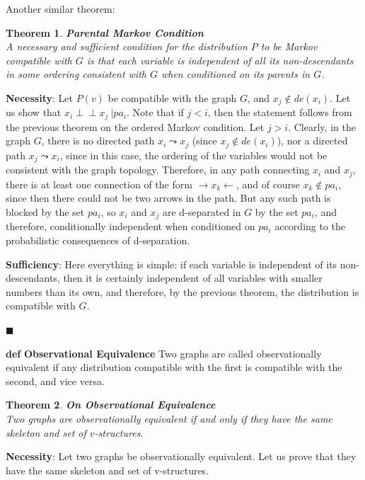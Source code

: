 \documentclass[fleqn]{article}
\newcommand{\independent}{\perp \!\!\! \perp}
\def\define#1{\textbf{def} \textbf{#1}}
\newtheorem{theorem}{Theorem}
\numberwithin{equation}{section}
\numberwithin{theorem}{section}
\numberwithin{figure}{section}
\numberwithin{lemma}{section}
\numberwithin{corollary}{section}
\begin{document}
Another similar theorem:

\begin{theorem} \textbf{Parental Markov Condition}\\
	A necessary and sufficient condition for the distribution \( P \) to be Markov compatible with \( G \) is that each variable is independent of all its \textit{non-descendants} in some ordering consistent with \( G \) when conditioned on its parents in \( G \).
\end{theorem}

\textbf{Necessity}: Let \( P(v) \) be compatible with the graph \( G \), and \( x_j \notin de(x_i) \). Let us show that \( x_i \independent x_j \ |pa_i \). Note that if \( j < i \), then the statement follows from the previous theorem on the ordered Markov condition. Let \( j > i \). Clearly, in the graph \( G \), there is no directed path \( x_i \leadsto x_j \) (since \( x_j \notin de(x_i) \)), nor a directed path \( x_j \leadsto x_i \), since in this case, the ordering of the variables would not be consistent with the graph topology. Therefore, in any path connecting \( x_i \) and \( x_j \), there is at least one connection of the form \( \rightarrow x_k \leftarrow \), and of course \( x_k \notin pa_i \), since then there could not be two arrows in the path. But any such path is blocked by the set \( pa_i \), so \( x_i \) and \( x_j \) are d-separated in \( G \) by the set \( pa_i \), and therefore, conditionally independent when conditioned on \( pa_i \) according to the probabilistic consequences of d-separation.

\textbf{Sufficiency}: Here everything is simple: if each variable is independent of its non-descendants, then it is certainly independent of all variables with smaller numbers than its own, and therefore, by the previous theorem, the distribution is compatible with \( G \).

\(\blacksquare\)

\define{Observational Equivalence} Two graphs are called observationally equivalent if any distribution compatible with the first is compatible with the second, and vice versa.

\begin{theorem} \textbf{On Observational Equivalence}\\
	Two graphs are observationally equivalent if and only if they have the same skeleton and set of \( v \)-structures.
\end{theorem}

\textbf{Necessity}: Let two graphs be observationally equivalent. Let us prove that they have the same skeleton and set of v-structures.
\end{document}
